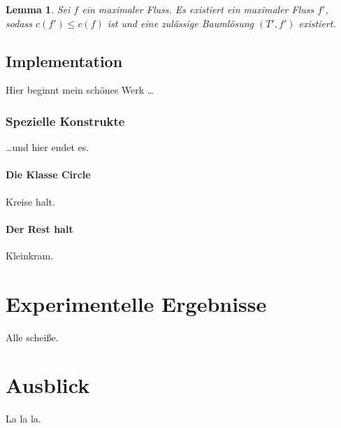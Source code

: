 \documentclass[a4paper,twoside,ngerman]{report}
\theoremstyle{plain}
\newtheorem{lem}[thm]{Lemma}
\theoremstyle{definition}
\begin{document}
\begin{lem}Sei $f$ ein maximaler Fluss. Es existiert ein maximaler Fluss $f'$, sodass $c(f')\leq c(f)$ ist und eine zulässige Baumlösung $(T',f')$ existiert.\end{lem}



\section{Implementation} \label{prog}
Hier beginnt mein schönes Werk \ldots

\subsection{Spezielle Konstrukte}
\ldots und hier endet es.

\subsubsection{Die Klasse Circle}
Kreise halt.\cite{NSAbook}

\subsubsection{Der Rest halt}
Kleinkram.

\newpage
\chapter{Experimentelle Ergebnisse}
Alle scheiße.

\newpage
\chapter{Ausblick}
La la la.

{}

\end{document}
